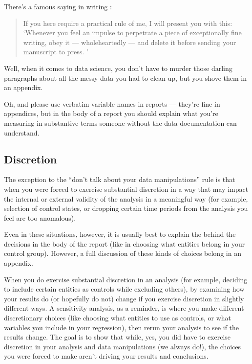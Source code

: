 \documentclass[letterpaper,10pt,english]{jupyterBook}
\begin{document}
\sphinxAtStartPar
There’s a famous saying in writing :
\begin{quote}

\sphinxAtStartPar
If you here require a practical rule of me, I will present you with this: ‘Whenever you feel an impulse to perpetrate a piece of exceptionally fine writing, obey it — whole\sphinxhyphen{}heartedly — and delete it before sending your manuscript to press. ’
\end{quote}

\sphinxAtStartPar
Well, when it comes to data science, you don’t have to murder those darling paragraphs about all the messy data you had to clean up, but you  shove them in an appendix.

\sphinxAtStartPar
Oh, and please  use verbatim variable names in reports — they’re fine in appendices, but in the body of a report you should explain what you’re measuring in substantive terms someone without the data documentation can understand.


\subsection{Discretion}
\label{\detokenize{40_in_practice/25_writing_to_stakeholders:discretion}}
\sphinxAtStartPar
The exception to the “don’t talk about your data manipulations” rule is that when you were forced to exercise substantial discretion in a way that may impact the internal or external validity of the analysis in a meaningful way (for example, selection of control states, or dropping certain time periods from the analysis you feel are too anomalous).

\sphinxAtStartPar
Even in these situations, however, it is usually best to explain the  behind the decisions in the body of the report (like in choosing what entities belong in your control group). However, a full discussion of these kinds of choices belong in an appendix.

\sphinxAtStartPar
When you do exercise substantial discretion in an analysis (for example, deciding to include certain entities as controls while excluding others),  by examining how your results do (or hopefully do not) change if you exercise discretion in slightly different ways. A sensitivity analysis, as a reminder, is where you make different discretionary choices (like choosing what entities to use as controls, or what variables you include in your regression), then re\sphinxhyphen{}run your analysis to see if the results change. The goal is to show that while, yes, you did have to exercise discretion in your analysis and data manipulations (we always do!), the choices you were forced to make aren’t driving your results and conclusions.
\end{document}
